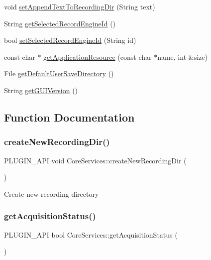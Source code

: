 \begin{DoxyCompactItemize}
void \mbox{\hyperlink{namespace_core_services_a75af2d5d3262b95e16bd51fe28a7e26d}{set\+Append\+Text\+To\+Recording\+Dir}} (String text)
\item 
String \mbox{\hyperlink{namespace_core_services_a03eb76579ab53edf169064232a0e2b62}{get\+Selected\+Record\+Engine\+Id}} ()
\item 
bool \mbox{\hyperlink{namespace_core_services_a5c4ad031dbb70b1ca2824a12e65dec86}{set\+Selected\+Record\+Engine\+Id}} (String id)
\item 
const char $\ast$ \mbox{\hyperlink{namespace_core_services_a40705adde6940ed1b94cf880a0cc54a0}{get\+Application\+Resource}} (const char $\ast$name, int \&size)
\item 
File \mbox{\hyperlink{namespace_core_services_a25f9182255aa7c83144c5f65819493bc}{get\+Default\+User\+Save\+Directory}} ()
\item 
String \mbox{\hyperlink{namespace_core_services_a93a10ea82325f2a1baf74ee22e5dbd23}{get\+G\+U\+I\+Version}} ()
\end{DoxyCompactItemize}


\subsection{Function Documentation}
\mbox{\label{namespace_core_services_a450d2d9574435570b5e4e38caaeb05d7}} 
\subsubsection{\texorpdfstring{create\+New\+Recording\+Dir()}{createNewRecordingDir()}}
{\footnotesize\ttfamily P\+L\+U\+G\+I\+N\+\_\+\+A\+PI void Core\+Services\+::create\+New\+Recording\+Dir (\begin{DoxyParamCaption}{ }\end{DoxyParamCaption})}

Create new recording directory \mbox{\label{namespace_core_services_afe3e006d8ad41f122bd0d68b9d5976b0}} 
\subsubsection{\texorpdfstring{get\+Acquisition\+Status()}{getAcquisitionStatus()}}
{\footnotesize\ttfamily P\+L\+U\+G\+I\+N\+\_\+\+A\+PI bool Core\+Services\+::get\+Acquisition\+Status (\begin{DoxyParamCaption}{ }\end{DoxyParamCaption})}

